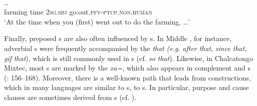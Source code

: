 \documentclass[output=paper]{langsci/langscibook}
\begin{document}
\ea\label{ex:diessel:14}
\\
 …\\
       farming  time   2\textsc{sg.sbj}  go:out.\textsc{pfv}-\textsc{ptcp.non.human} \\
\glt   `At the time when you (first) went out to do the farming, …'
\z

Finally, preposed s are also often influenced by s. In Middle , for instance, adverbial s were frequently accompanied by the  \textit{that} \textit{(e.g.} \textit{after} \textit{that,} \textit{since} \textit{that,} \textit{gif} \textit{that}), which is still commonly used in s (cf. \textit{so} \textit{that}). Likewise, in Chalcatongo Mixtec, most s are marked by the  \textit{xa=}, which also appears in complement and s (\citealt{Macaulay1996}: 156--168). Moreover, there is a well-known path that leads from  constructions, which in many languages are similar to s, to s. In particular, purpose and cause clauses are sometimes derived from s (cf. \citealt{Güldemann2008}). 
\end{document}
